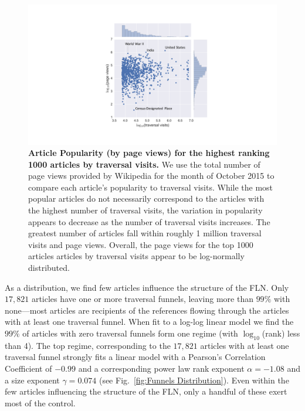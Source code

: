 \begin{figure}[tp!]
  \includegraphics[width=\columnwidth]{graphics/popularity_visits.pdf}
  \caption{
\textbf{Article Popularity (by page views) for the highest ranking 1000 articles by traversal visits.}
We use the total number of page views provided by Wikipedia for the month
of October 2015 to compare each article's popularity to traversal visits.
While the most popular articles do not necessarily correspond to the articles
with the highest number of traversal visits, the variation in popularity appears to decrease as the number of traversal visits increases. The greatest number of articles fall within roughly 1 million traversal visits and page views. Overall, the page views for the top 1000 articles articles by traversal visits appear to be log-normally distributed. 
}
  \label{fig:Views and Visits}

\end{figure}
As a distribution, we find few articles influence the structure of the 
FLN. Only $17, 821$ articles have one or more traversal funnels, leaving
more than $99\%$ with none---most articles are recipients of 
the references flowing through the articles with at least one traversal funnel.
When fit to a log-log linear model we find the $99\%$ of articles with zero
traversal funnels form one regime (with $\log_{10}$(rank) less than 4).
The top regime, corresponding to the $17, 821$ articles with at least one 
traversal funnel strongly fits a linear model with
a Pearson's Correlation Coefficient of $-0.99$ and a 
corresponding power law rank exponent $\alpha = -1.08$
and a size exponent $\gamma = 0.074$ 
(see Fig.~\ref{fig:Funnels Distribution}). Even within the few articles
influencing the structure of the FLN, only a handful of these exert most of the 
control. 

